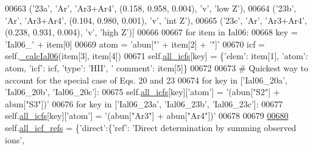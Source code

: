 \begin{DoxyCode}
00663                  (\textcolor{stringliteral}{'23a'}, \textcolor{stringliteral}{'Ar'}, \textcolor{stringliteral}{'Ar3+Ar4'}, (0.158, 0.958, 0.004), \textcolor{stringliteral}{'v'}, \textcolor{stringliteral}{'low Z'}),
00664                  (\textcolor{stringliteral}{'23b'}, \textcolor{stringliteral}{'Ar'}, \textcolor{stringliteral}{'Ar3+Ar4'}, (0.104, 0.980, 0.001), \textcolor{stringliteral}{'v'}, \textcolor{stringliteral}{'int Z'}),
00665                  (\textcolor{stringliteral}{'23c'}, \textcolor{stringliteral}{'Ar'}, \textcolor{stringliteral}{'Ar3+Ar4'}, (0.238, 0.931, 0.004), \textcolor{stringliteral}{'v'}, \textcolor{stringliteral}{'high Z'})]
00666         
00667         \textcolor{keywordflow}{for} item \textcolor{keywordflow}{in} Ial06:
00668             key = \textcolor{stringliteral}{'Ial06\_'} + item[0]
00669             atom = \textcolor{stringliteral}{'abun["'} + item[2] + \textcolor{stringliteral}{'"]'}
00670             icf = self.\hyperlink{classpyneb_1_1core_1_1icf_1_1_i_c_f_a985320521114915c449f464ee3c62ceb}{\_calcIal06}(item[3], item[4])
00671             self.\hyperlink{classpyneb_1_1core_1_1icf_1_1_i_c_f_a854ee87a53feb102e429e902227ce88b}{all\_icfs}[key] = \{\textcolor{stringliteral}{'elem'}: item[1], \textcolor{stringliteral}{'atom'}: atom, \textcolor{stringliteral}{'icf'}: icf, \textcolor{stringliteral}{'type'}: \textcolor{stringliteral}{'HII'}, \textcolor{stringliteral}{'
      comment'}: item[5]\}
00672 
00673         \textcolor{comment}{# Quickest way to account for the special case of Eqs. 20 and 23}
00674         \textcolor{keywordflow}{for} key \textcolor{keywordflow}{in} [\textcolor{stringliteral}{'Ial06\_20a'}, \textcolor{stringliteral}{'Ial06\_20b'}, \textcolor{stringliteral}{'Ial06\_20c'}]:
00675             self.\hyperlink{classpyneb_1_1core_1_1icf_1_1_i_c_f_a854ee87a53feb102e429e902227ce88b}{all\_icfs}[key][\textcolor{stringliteral}{'atom'}] = \textcolor{stringliteral}{'(abun["S2"] + abun["S3"])'}
00676         \textcolor{keywordflow}{for} key \textcolor{keywordflow}{in} [\textcolor{stringliteral}{'Ial06\_23a'}, \textcolor{stringliteral}{'Ial06\_23b'}, \textcolor{stringliteral}{'Ial06\_23c'}]:
00677             self.\hyperlink{classpyneb_1_1core_1_1icf_1_1_i_c_f_a854ee87a53feb102e429e902227ce88b}{all\_icfs}[key][\textcolor{stringliteral}{'atom'}] = \textcolor{stringliteral}{'(abun["Ar3"] + abun["Ar4"])'}
00678         
00679 
\hypertarget{classpyneb_1_1core_1_1icf_1_1_i_c_f_l00680}{}\hyperlink{classpyneb_1_1core_1_1icf_1_1_i_c_f_a9777abc7cc843cd5c4d8c5810c1b2ed1}{00680}         self.\hyperlink{classpyneb_1_1core_1_1icf_1_1_i_c_f_a9777abc7cc843cd5c4d8c5810c1b2ed1}{all\_icf\_refs} = \{\textcolor{stringliteral}{'direct'}:\{\textcolor{stringliteral}{'ref'}: \textcolor{stringliteral}{'Direct determination by summing observed ions'},

\end{DoxyCode}
